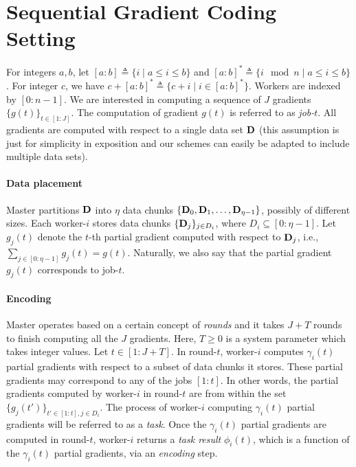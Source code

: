 \section{Sequential Gradient Coding Setting}\label{ch2:sec:setting}

For integers $a,b$, let $[a:b]\triangleq \{i\mid a\leq i\leq b\}$ and $[a:b]^*\triangleq \{i \mod n\mid a\leq i\leq b\}$. For integer $c$, we have $c+[a:b]^*\triangleq \{c+i\mid i\in[a:b]^*\}$. Workers are indexed by $[0:n-1]$. We are interested in computing a sequence of $J$ gradients $\{g(t)\}_{t\in[1:J]}$. The computation of gradient $g(t)$ is referred to as \textit{job-$t$}. All gradients are computed with respect to a single data set $\mathbf{D}$ (this assumption is just for simplicity in exposition and our schemes can easily be adapted to include multiple data sets). 

\paragraph{Data placement} Master partitions $\mathbf{D}$ into $\eta$ data chunks $\{\mathbf{D}_0,\mathbf{D}_1,\ldots,\mathbf{D}_{\eta-1}\}$, possibly of different sizes. Each worker-$i$ stores data chunks $\{\mathbf{D}_j\}_{j\in{D}_i}$, where ${D}_i\subseteq[0:\eta-1]$. Let $g_{j}(t)$ denote the $t$-th partial gradient computed with respect to $\mathbf{D}_{j}$, i.e., $\sum_{j\in[0:\eta-1]}g_{j}(t)=g(t)$. Naturally, we also say that the partial gradient $g_{j}(t)$ corresponds to job-$t$.

\paragraph{Encoding} Master operates based on a certain concept of \textit{rounds} and it takes $J+T$ rounds to finish computing all the $J$ gradients. Here, $T\geq0$ is a system parameter which takes integer values.  Let $t\in[1:J+T]$. In round-$t$, worker-$i$ computes $\gamma_i(t)$  partial gradients with respect to a subset of data chunks it stores. These partial gradients may correspond to any of the jobs $[1:t]$. In other words, the partial gradients computed by worker-$i$ in round-$t$ are from within the set $\{g_{j}(t')\}_{t'\in[1:t],j\in{D}_i}$. The process of worker-$i$ computing $\gamma_i(t)$ partial gradients will be referred to as a \textit{task}. Once the $\gamma_i(t)$ partial gradients are computed in round-$t$, worker-$i$ returns a \textit{task result} $\phi_i(t)$, which is a function of the $\gamma_i(t)$ partial gradients, via an \textit{encoding} step. %


